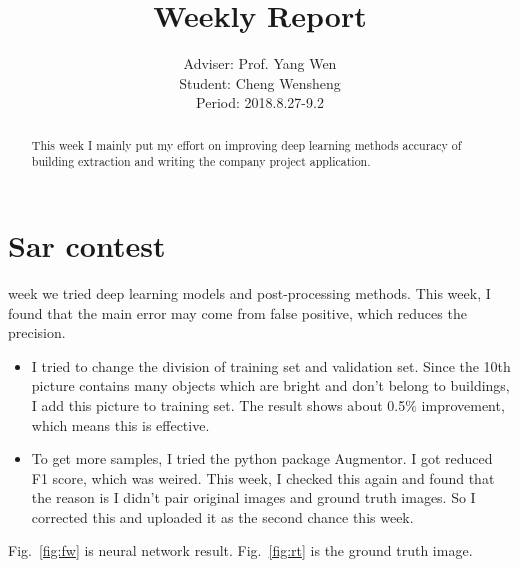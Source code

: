 \documentclass[]{IEEEtran}
\begin{document}
	\title{Weekly Report}
	\author{Adviser: Prof. Yang Wen \\Student: Cheng Wensheng\\ Period: 2018.8.27-9.2
	}
	\maketitle

\begin{abstract}
	This week I mainly put my effort on improving deep learning methods accuracy of building extraction and writing the company project application.
\end{abstract}

\section{Sar contest}
	 week we tried deep learning models and post-processing methods. This week, I found that the main error may come from false positive, which reduces the precision.
	\begin{itemize}
		\item I tried to change the division of training set and validation set. Since the 10th picture contains many objects which are bright and don't belong to buildings, I add this picture to training set. The result shows about 0.5$\%$ improvement, which means this is effective.
		\item To get more samples, I tried the python package Augmentor. I got reduced F1 score, which was weired. This week, I checked this again and found that the reason is I didn't pair original images and ground truth images. So I corrected this and uploaded it as the second chance this week.
	\end{itemize}
	
	Fig.~\ref{fig:fw} is neural network result. Fig.~\ref{fig:rt} is the ground truth image.
\end{document}
